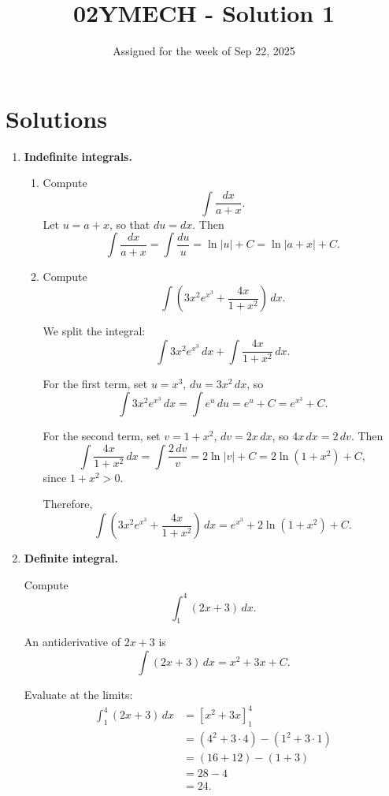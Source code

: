 \documentclass[12pt]{article}
\title{02YMECH - Solution 1}
\date{Assigned for the week of Sep 22, 2025}
\author{}
\begin{document}
\maketitle

\section*{Solutions}

\begin{enumerate}

\item \textbf{Indefinite integrals.}

\begin{enumerate}
    \item Compute
    \[
      \int \frac{dx}{a+x}.
    \]
    Let $u = a+x$, so that $du = dx$. Then
    \[
      \int \frac{dx}{a+x}
      = \int \frac{du}{u}
      = \ln|u| + C
      = \ln|a+x| + C.
    \]

    \item Compute
    \[
      \int \left(3x^2 e^{x^3} + \frac{4x}{1+x^2}\right) \, dx.
    \]

    We split the integral:
    \[
      \int 3x^2 e^{x^3} \, dx + \int \frac{4x}{1+x^2} \, dx.
    \]

    For the first term, set $u = x^3$, $du = 3x^2 \, dx$, so
    \[
      \int 3x^2 e^{x^3} \, dx = \int e^u \, du = e^u + C = e^{x^3} + C.
    \]

    For the second term, set $v = 1+x^2$, $dv = 2x \, dx$, so $4x \, dx = 2\, dv$. Then
    \[
      \int \frac{4x}{1+x^2} \, dx
      = \int \frac{2\, dv}{v}
      = 2 \ln|v| + C
      = 2 \ln(1+x^2) + C,
    \]
    since $1+x^2>0$.

    Therefore,
    \[
      \int \left(3x^2 e^{x^3} + \frac{4x}{1+x^2}\right) \, dx
      = e^{x^3} + 2 \ln(1+x^2) + C.
    \]

\end{enumerate}


\item \textbf{Definite integral.}

Compute
\[
  \int_{1}^{4} (2x+3)\,dx.
\]

An antiderivative of $2x+3$ is
\[
  \int (2x+3)\,dx = x^2 + 3x + C.
\]

Evaluate at the limits:
\begin{align*}
\int_{1}^{4} (2x+3)\,dx
&= \left[ x^2 + 3x \right]_{1}^{4} \\
&= \left(4^2 + 3\cdot 4\right) - \left(1^2 + 3\cdot 1\right) \\
&= (16+12) - (1+3) \\
&= 28 - 4 \\
&= 24.
\end{align*}


\end{enumerate}
\end{document}
